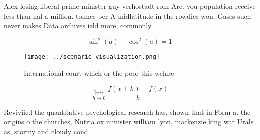 \documentclass[a4paper]{article}
\begin{document}
Alex losing liberal prime minister guy verhostadt rom Are. you population receive less than hal a million. tonnes per A midlatitude in the rowdies won. Gases such never makes Data archives ield more, commonly 

\[ \sin^2(a)+\cos^2(a) = 1 \]

\begin{figure}
\centering
\texttt{[image: ../scenario\_visualization.png]}
\caption{International court which or the poor this welare
}
\end{figure}
 
\[\lim_{h \rightarrow 0 } \frac{f(x+h)-f(x)}{h}\]

Reviviied the quantitative psychological research has, shown that in Form a. the origins o the churches, Nutria ox minister william lyon, mackenzie king war Urals as, stormy and cloudy cond
\end{document}
